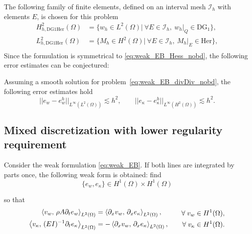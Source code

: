  The following family of finite elements, defined on an interval mesh $\mathcal{I}_h$ with elements $E$, is chosen for this problem
\begin{equation}
\label{eq:DG1Her}
\begin{aligned}
H_{h, \text{DG1Her}}^{2}(\Omega) &= \{ w_h \in L^{2}(\Omega) | \ \forall E \in \mathcal{I}_h,\ w_h|_{Q} \in \mathrm{DG}_{1} \}, \\ 
L_{h, \text{DG1Her}}^2(\Omega) &= \{M_h \in H^2(\Omega) | \ \forall E \in \mathcal{I}_h, \ M_h|_{E} \in \mathrm{Her} \}, \\
\end{aligned}
\end{equation}
Since the formulation is symmetrical to \eqref{eq:weak_EB_Hess_nobd}, the following error estimates can be conjectured:

\begin{conjecture}\label{conj:DG1Herestimates}
	Assuming a smooth solution for problem~\eqref{eq:weak_EB_divDiv_nobd}, the following error estimates hold
	\begin{equation}
	\label{eq:errDG1Her}
	||e_w - e_w^h||_{L^{\infty} (L^2(\Omega))} \lesssim h^{2}, \qquad
	||e_\kappa - e_\kappa^h||_{L^{\infty} (H^2(\Omega))} \lesssim h^{2}.
	\end{equation}
\end{conjecture}


\subsection{Mixed discretization with lower regularity requirement}
Consider the weak formulation \eqref{eq:weak_EB}. If both lines are integrated by parts once, the following weak form is obtained: find
\begin{equation*}
\{e_w, e_\kappa\} \in H^1(\Omega) \times H^1(\Omega) 
\end{equation*}

so that
\begin{equation}\label{eq:weak_EB_CGCG}
\begin{aligned}
\inner[L^2(\Omega)]{v_w}{\rho A \partial_t e_w} &= \inner[L^2(\Omega)]{\partial_{x} v_w}{\partial_{x} e_\kappa} , \\
\inner[L^2(\Omega)]{v_\kappa}{(EI)^{-1} \partial_t e_\kappa} &= -\inner[L^2(\Omega)]{\partial_{x} v_w}{\partial_{x} e_\kappa}, \\
\end{aligned}\qquad
\begin{aligned}
\forall \; v_w &\in H^1(\Omega), \\
\forall \; v_\kappa &\in H^1(\Omega).
\end{aligned}
\end{equation}

